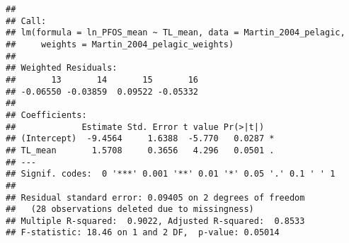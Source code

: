 \documentclass[
]{article}
\newenvironment{Shaded}{\begin{snugshade}}{\end{snugshade}}
\newcommand{\AttributeTok}[1]{\textcolor[rgb]{0.13,0.29,0.53}{#1}}
\newcommand{\CommentTok}[1]{\textcolor[rgb]{0.56,0.35,0.01}{\textit{#1}}}
\newcommand{\DecValTok}[1]{\textcolor[rgb]{0.00,0.00,0.81}{#1}}
\newcommand{\FunctionTok}[1]{\textcolor[rgb]{0.13,0.29,0.53}{\textbf{#1}}}
\newcommand{\NormalTok}[1]{#1}
\newcommand{\OtherTok}[1]{\textcolor[rgb]{0.56,0.35,0.01}{#1}}
\newcommand{\SpecialCharTok}[1]{\textcolor[rgb]{0.81,0.36,0.00}{\textbf{#1}}}
\newcommand{\StringTok}[1]{\textcolor[rgb]{0.31,0.60,0.02}{#1}}
\begin{document}
\begin{Shaded}
\end{Shaded}

\begin{verbatim}
## 
## Call:
## lm(formula = ln_PFOS_mean ~ TL_mean, data = Martin_2004_pelagic, 
##     weights = Martin_2004_pelagic_weights)
## 
## Weighted Residuals:
##       13       14       15       16 
## -0.06550 -0.03859  0.09522 -0.05332 
## 
## Coefficients:
##             Estimate Std. Error t value Pr(>|t|)  
## (Intercept)  -9.4564     1.6388  -5.770   0.0287 *
## TL_mean       1.5708     0.3656   4.296   0.0501 .
## ---
## Signif. codes:  0 '***' 0.001 '**' 0.01 '*' 0.05 '.' 0.1 ' ' 1
## 
## Residual standard error: 0.09405 on 2 degrees of freedom
##   (28 observations deleted due to missingness)
## Multiple R-squared:  0.9022, Adjusted R-squared:  0.8533 
## F-statistic: 18.46 on 1 and 2 DF,  p-value: 0.05014
\end{verbatim}
\end{document}
